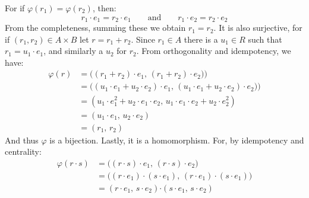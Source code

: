 \documentclass[crop=false,class=article]{standalone}                       %
\begin{document}
\begin{solution}
            For if $\varphi(r_{1})=\varphi(r_{2})$, then:
            \begin{equation}
                r_{1}\cdot{e}_{1}=r_{2}\cdot{e}_{1}
                \quad\quad
                \textrm{and}
                \quad\quad
                r_{1}\cdot{e}_{2}=r_{2}\cdot{e_{2}}
            \end{equation}
            From the completeness, summing these we obtain $r_{1}=r_{2}$.
            It is also surjective, for if $(r_{1},r_{2})\in{A}\times{B}$
            let $r=r_{1}+r_{2}$. Since $r_{1}\in{A}$ there is a
            $u_{1}\in{R}$ such that $r_{1}=u_{1}\cdot{e}_{1}$, and similarly
            a $u_{2}$ for $r_{2}$. From orthogonality and idempotency,
            we have:
            \begin{subequations}
                \begin{align}
                    \varphi(r)
                    &=\big((r_{1}+r_{2})\cdot{e}_{1},\,
                           (r_{1}+r_{2})\cdot{e}_{2})\big)\\
                    &=\big(
                        (u_{1}\cdot{e}_{1}+u_{2}\cdot{e}_{2})\cdot{e}_{1},\,
                        (u_{1}\cdot{e}_{1}+u_{2}\cdot{e}_{2})\cdot{e}_{2})
                    \big)\\
                    &=(u_{1}\cdot{e}_{1}^{2}+
                       u_{2}\cdot{e}_{1}\cdot{e}_{2},\,
                       u_{1}\cdot{e}_{1}\cdot{e}_{2}+
                       u_{2}\cdot{e}_{2}^{2})\\
                     &=(u_{1}\cdot{e}_{1},\,u_{2}\cdot{e}_{2})\\
                     &=(r_{1},\,r_{2})
                \end{align}
            \end{subequations}
            And thus $\varphi$ is a bijection. Lastly, it is a homomorphism.
            For, by idempotency and centrality:
            \begin{subequations}
                \begin{align}
                    \varphi(r\cdot{s})
                    &=\big((r\cdot{s})\cdot{e}_{1},\,
                           (r\cdot{s})\cdot{e}_{2}\big)\\
                    &=\big((r\cdot{e}_{1})\cdot(s\cdot{e}_{1}),\,
                           (r\cdot{e}_{1})\cdot(s\cdot{e}_{1})\big)\\
                    &=(r\cdot{e}_{1},\,s\cdot{e}_{2})\boldsymbol{\cdot}
                      (s\cdot{e}_{1},\,s\cdot{e}_{2})\\

\end{align}
\end{subequations}
\end{solution}
\end{document}
